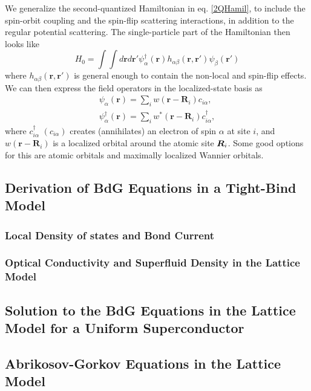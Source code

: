 We generalize the second-quantized Hamiltonian in eq. \ref{2QHamil}, to include the spin-orbit coupling and the spin-flip scattering interactions, in addition to the regular potential scattering. The single-particle part of the Hamiltonian then looks like
\begin{equation}
    H_0 = \int \int d\bm{r}d\bm{r}' \psi_\alpha^\dagger(\bm{r}) h_{\alpha\beta}(\bm{r},\bm{r}') \psi_\beta(\bm{r}')
\end{equation}
where $h_{\alpha\beta}(\bm{r},\bm{r}')$ is general enough to contain the non-local and spin-flip effects. We can then express the field operators in the localized-state basis as
\begin{eqnarray}
    \psi_\alpha(\bm{r}) = \sum_i w(\bm{r} - \bm{R}_i)c_{i\alpha},\\
    \psi_\alpha^\dagger(\bm{r}) = \sum_i w^*(\bm{r} - \bm{R}_i)c_{i\alpha}^\dagger,
\end{eqnarray}
where $c_{i\alpha}^\dagger$ $(c_{i\alpha})$ creates (annihilates) an electron of spin $\alpha$ at site $i$, and $w(\bm{r} - \bm{R}_i)$ is a localized orbital around the atomic site $\bm{R}_i$. Some good options for this are atomic orbitals and maximally localized Wannier orbitals.








\subsection{Derivation of BdG Equations in a Tight-Bind Model}

\subsubsection{Local Density of states and Bond Current}

\subsubsection{Optical Conductivity and Superfluid Density in the Lattice Model}

\subsection{Solution to the BdG Equations in the Lattice Model for a Uniform Superconductor}

\subsection{Abrikosov-Gorkov Equations in the Lattice Model}